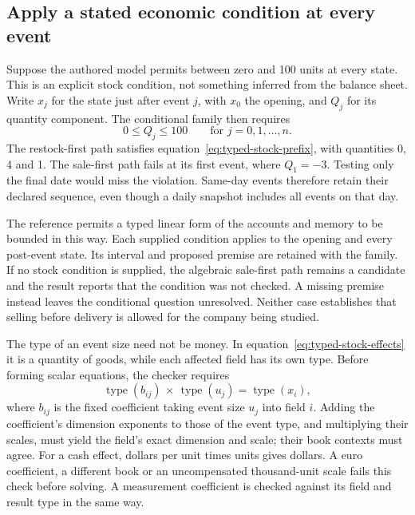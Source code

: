 \subsection{Apply a stated economic condition at every event}

Suppose the authored model permits between zero and 100 units at every state.
This is an explicit stock condition, not something inferred from the balance
sheet. Write \(x_j\) for the state just after event \(j\), with \(x_0\)
the opening, and \(Q_j\) for its quantity component. The conditional family
then requires
\begin{equation}
\label{eq:typed-stock-prefix}
 0\leq Q_j\leq100\qquad\text{for }j=0,1,\ldots,n.
\end{equation}
The restock-first path satisfies equation~\eqref{eq:typed-stock-prefix},
with quantities 0, 4 and 1. The sale-first path fails at its first event,
where \(Q_1=-3\). Testing only the final date would miss the violation.
Same-day events therefore retain their declared sequence, even though a daily
snapshot includes all events on that day.

The  reference permits a typed linear form of the
accounts and memory to be bounded in this way. Each supplied condition applies
to the opening and every post-event state. Its interval and proposed premise
are retained with the family. If no stock condition is supplied, the algebraic
sale-first path remains a candidate and the result reports that the condition
was not checked. A missing premise instead leaves the conditional question
unresolved. Neither case establishes that selling before delivery is allowed
for the company being studied.

The type of an event size need not be money. In equation~\eqref{eq:typed-stock-effects}
it is a quantity of goods, while each affected field has its own type. Before
forming scalar equations, the checker requires
\begin{equation}
\label{eq:typed-history-product}
 \operatorname{type}(b_{ij})\,\times\,
 \operatorname{type}(u_j)=\operatorname{type}(x_i),
\end{equation}
where \(b_{ij}\) is the fixed coefficient taking event size \(u_j\) into
field \(i\). Adding the coefficient's dimension exponents to those of the
event type, and multiplying their scales, must yield the field's exact dimension
and scale; their book
contexts must agree. For a cash effect, dollars per unit times units gives
dollars. A euro coefficient, a different book or an uncompensated thousand-unit
scale fails this check before solving. A measurement coefficient is checked
against its field and result type in the same way.

